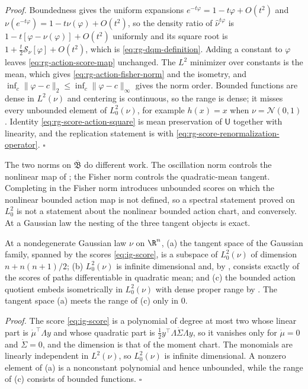 \noindent\emph{Proof.}
Boundedness gives the uniform expansions \(e^{-t\varphi}=1-t\varphi+O(t^2)\) and
\(\nu(e^{-t\varphi})=1-t\nu(\varphi)+O(t^2)\), so the density ratio of
\(\widehat\nu^{t\varphi}\) is \(1-t[\varphi-\nu(\varphi)]+O(t^2)\) uniformly and its square
root is \(1+\tfrac t2\mathscr S_\nu[\varphi]+O(t^2)\), which is
\eqref{eq:rg-dqm-definition}. Adding a constant to \(\varphi\) leaves
\eqref{eq:rg-action-score-map} unchanged. The \(L^2\) minimizer over constants is the
mean, which gives \eqref{eq:rg-action-fisher-norm} and the isometry, and
\(\inf_c\lVert\varphi-c\rVert_2\leq\inf_c\lVert\varphi-c\rVert_\infty\) gives the norm
order. Bounded functions are dense in \(L^2(\nu)\) and centering is continuous, so the
range is dense; it misses every unbounded element of \(L^2_0(\nu)\), for example
\(h(x)=x\) when \(\nu=\mathcal N(0,1)\). Identity \eqref{eq:rg-score-action-square} is mean
preservation of \(\mathsf U\) together with linearity, and the replication statement is
 with \eqref{eq:rg-score-renormalization-operator}.
\hfill$\square$

\medskip
The two norms on \(\overline{\mathfrak B}\) do different work. The oscillation norm
controls the nonlinear map of ; the Fisher norm
controls the quadratic-mean tangent. Completing in the Fisher norm introduces
unbounded scores on which the nonlinear bounded action map is not defined, so a
spectral statement proved on \(L^2_0\) is not a statement about the nonlinear bounded
action chart, and conversely. At a Gaussian law the nesting of the three tangent
objects is exact.

At a nondegenerate Gaussian law \(\nu\) on \(\R^n\), (a) the tangent space of the
Gaussian family, spanned by the scores \eqref{eq:ig-score}, is a subspace of
\(L^2_0(\nu)\) of dimension \(n+n(n+1)/2\); (b) \(L^2_0(\nu)\) is infinite dimensional and,
by , consists exactly of the scores of paths
differentiable in quadratic mean; and (c) the bounded action quotient embeds
isometrically in \(L^2_0(\nu)\) with dense proper range by
. The tangent space (a) meets the range of (c) only
in \(0\). 

\noindent\emph{Proof.}
The score \eqref{eq:ig-score} is a polynomial of degree at most two whose linear part
is \(\dot\mu^\top\Lambda y\) and whose quadratic part is
\(\tfrac12y^\top\Lambda\dot\Sigma\Lambda y\), so it vanishes only for
\(\dot\mu=0\) and \(\dot\Sigma=0\), and the dimension is that of the moment chart. The
monomials are linearly independent in \(L^2(\nu)\), so \(L^2_0(\nu)\) is infinite
dimensional. A nonzero element of (a) is a nonconstant polynomial and hence unbounded,
while the range of (c) consists of bounded functions. \hfill$\square$

